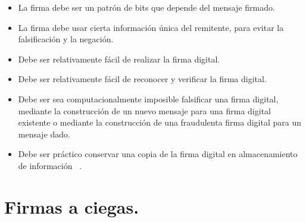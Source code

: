 	\begin{itemize}
		\item La firma debe ser un patrón de bits que depende del mensaje firmado.
		\item La firma debe usar cierta información única del remitente, para evitar la falsificación y la negación.
		\item Debe ser relativamente fácil de realizar la firma digital.
		\item Debe ser relativamente fácil de reconocer y verificar la firma digital.
		\item  Debe ser sea computacionalmente imposible falsificar una firma digital, mediante la construcción de un nuevo mensaje para una firma digital existente o mediante la construcción de una fraudulenta firma digital para un mensaje dado.
		\item Debe ser práctico conservar una copia de la firma digital en almacenamiento de información ~\cite{modes}.
	\end{itemize}



\section{Firmas a ciegas. }

